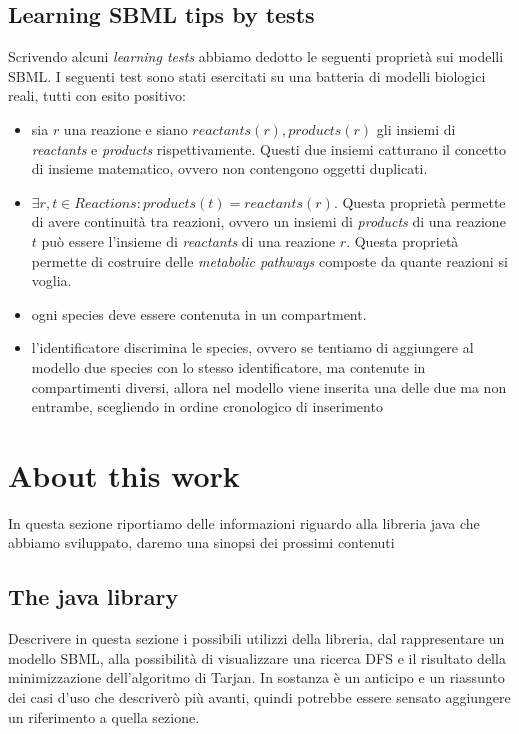 \subsection{Learning SBML tips by tests}

Scrivendo alcuni \emph{learning tests} abbiamo dedotto le seguenti
propriet\`a sui modelli SBML. I seguenti test sono stati esercitati su
una batteria di modelli biologici reali, tutti con esito positivo:
\begin{itemize}
\item sia $r$ una reazione e siano $reactants(r), products(r)$ gli
  insiemi di \emph{reactants} e \emph{products}
  rispettivamente. Questi due insiemi catturano il concetto di insieme
  matematico, ovvero non contengono oggetti duplicati.
\item $\exists r,t \in Reactions: products(t) = reactants(r)$. Questa
  propriet\`a permette di avere continuit\`a tra reazioni, ovvero un
  insiemi di \emph{products} di una reazione $t$ pu\`o essere
  l'insieme di \emph{reactants} di una reazione $r$. Questa
  propriet\`a permette di costruire delle \emph{metabolic pathways}
  composte da quante reazioni si voglia.
\item ogni species deve essere contenuta in un compartment.
\item l'identificatore discrimina le species, ovvero se tentiamo di
  aggiungere al modello due species con lo stesso identificatore, ma
  contenute in compartimenti diversi, allora nel modello viene
  inserita una delle due ma non entrambe, scegliendo in ordine
  cronologico di inserimento
\end{itemize}

\section{About this work}
In questa sezione riportiamo delle informazioni riguardo alla libreria
java che abbiamo sviluppato, daremo una sinopsi dei prossimi contenuti

\subsection{The java library}
Descrivere in questa sezione i possibili utilizzi della libreria, dal
rappresentare un modello SBML, alla possibilit\`a di visualizzare una
ricerca DFS e il risultato della minimizzazione dell'algoritmo di
Tarjan. In sostanza \`e un anticipo e un riassunto dei casi d'uso che
descriver\`o pi\`u avanti, quindi potrebbe essere sensato aggiungere
un riferimento a quella sezione.

